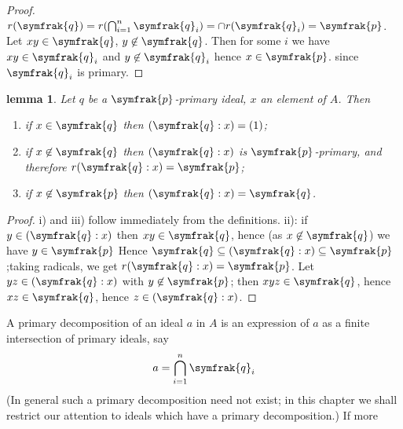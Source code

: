 \documentclass{standalone}
\newtheorem{lemma}[theorem]{lemma}
\theoremstyle{definition}
\theoremstyle{remark}
\begin{document}
\begin{proof}
  $r(\symfrak{q}) = r(\bigcap_{i=1}^{n} \symfrak{q}_i) = \cap r(\symfrak{q}_i) = \symfrak{p}$. Let $xy\in \symfrak{q}$, $y \not\in
  \symfrak{q}$. Then for some $i$ we have $xy \in \symfrak{q}_i$ and $y\not\in \symfrak{q}_i$ hence $x\in \symfrak{p}$. since $\symfrak{q}_i$ is primary.
\end{proof}
\begin{lemma}
  Let $q$ be a $\symfrak{p}$-primary ideal, $x$ an element of $A$. Then
\begin{enumerate}
\item if $x \in \symfrak{q}$ then $(\symfrak{q}:x) = (1)$;
\item if $x \not\in \symfrak{q}$ then $(\symfrak{q}:x)$ is $\symfrak{p}$-primary, and therefore $r(\symfrak{q}:x) = \symfrak{p}$;
\item if $x\not\in \symfrak{p}$ then $(\symfrak{q}:x) = \symfrak{q}$.
\end{enumerate}
\end{lemma}
\begin{proof}
  i) and iii) follow immediately from the definitions.
  ii): if $y \in (\symfrak{q}:x)$ then $xy \in \symfrak{q}$, hence (as $x \not\in \symfrak{q}$) we have $y\in
  \symfrak{p}$ Hence $\symfrak{q} \subseteq (\symfrak{q}:x)\subseteq \symfrak{p}$;taking radicals, we get $r(\symfrak{q}:x) = \symfrak{p}$.
  Let $yz\in(\symfrak{q}:x)$ with $y\not\in \symfrak{p}$; then
  $xyz \in \symfrak{q}$, hence $xz \in \symfrak{q}$, hence $z \in (\symfrak{q}:x)$.
\end{proof}
A primary decomposition of an ideal $a$ in $A$ is an expression of $a$ as a finite
intersection of primary ideals, say
\begin{equation}
  \label{eq:4.1}
  a=\bigcap_{i=1}^{n}\symfrak{q}_i
\end{equation}
(In general such a primary decomposition need not exist; in this chapter we shall
restrict our attention to ideals which have a primary decomposition.) If more
\end{document}
